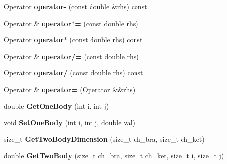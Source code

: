 \begin{DoxyCompactItemize}
\item 
\hypertarget{classOperator_ab608309d2c25a2cabd0a65e9ac7dbc4d}{\hyperlink{classOperator}{Operator} {\bfseries operator-\/} (const double \&rhs) const }\label{classOperator_ab608309d2c25a2cabd0a65e9ac7dbc4d}

\item 
\hypertarget{classOperator_a9398ce826d8ef57e69a1aa776734080f}{\hyperlink{classOperator}{Operator} \& {\bfseries operator$\ast$=} (const double rhs)}\label{classOperator_a9398ce826d8ef57e69a1aa776734080f}

\item 
\hypertarget{classOperator_a0eeafc807e6ef6e3d30810f114e249bb}{\hyperlink{classOperator}{Operator} {\bfseries operator$\ast$} (const double rhs) const }\label{classOperator_a0eeafc807e6ef6e3d30810f114e249bb}

\item 
\hypertarget{classOperator_a53af250702ec7c48de5397b209ebc09e}{\hyperlink{classOperator}{Operator} \& {\bfseries operator/=} (const double rhs)}\label{classOperator_a53af250702ec7c48de5397b209ebc09e}

\item 
\hypertarget{classOperator_a60c6e3fa8da186a1183e540e6ff04421}{\hyperlink{classOperator}{Operator} {\bfseries operator/} (const double rhs) const }\label{classOperator_a60c6e3fa8da186a1183e540e6ff04421}

\item 
\hypertarget{classOperator_ab1d24f45c7e10139e41084c8dc7f34ec}{\hyperlink{classOperator}{Operator} \& {\bfseries operator=} (\hyperlink{classOperator}{Operator} \&\&rhs)}\label{classOperator_ab1d24f45c7e10139e41084c8dc7f34ec}

\item 
\hypertarget{classOperator_a34eb5fa0e6d415cd44e1a3034d1cf5c0}{double {\bfseries Get\-One\-Body} (int i, int j)}\label{classOperator_a34eb5fa0e6d415cd44e1a3034d1cf5c0}

\item 
\hypertarget{classOperator_ae85aa3d8fdaeb3cb6266c3a4494e904b}{void {\bfseries Set\-One\-Body} (int i, int j, double val)}\label{classOperator_ae85aa3d8fdaeb3cb6266c3a4494e904b}

\item 
\hypertarget{classOperator_a2d7e90f24adab6ff517a6bc2b9a48336}{size\-\_\-t {\bfseries Get\-Two\-Body\-Dimension} (size\-\_\-t ch\-\_\-bra, size\-\_\-t ch\-\_\-ket)}\label{classOperator_a2d7e90f24adab6ff517a6bc2b9a48336}

\item 
\hypertarget{classOperator_a95607a28a7dc6f7c3be21474d214c46b}{double {\bfseries Get\-Two\-Body} (size\-\_\-t ch\-\_\-bra, size\-\_\-t ch\-\_\-ket, size\-\_\-t i, size\-\_\-t j)}\label{classOperator_a95607a28a7dc6f7c3be21474d214c46b}


\end{DoxyCompactItemize}
